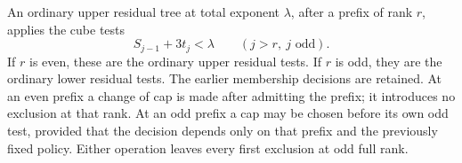 An ordinary upper residual tree at total exponent $\lambda$, after
a prefix of rank $r$, applies the cube tests
\begin{equation}\label{sv:upper-cubes}
 S_{j-1}+3t_j<\lambda\qquad(j>r,\ j\text{ odd}).
\end{equation}
If $r$ is even, these are the ordinary upper residual tests.  If $r$
is odd, they are the ordinary lower residual tests.  The earlier
membership decisions are retained.  At an even prefix a change of cap
is made after admitting the prefix; it introduces no exclusion at that
rank.  At an odd prefix a cap may be chosen before its own odd test,
provided that the decision depends only on that prefix and the
previously fixed policy.  Either operation leaves every first
exclusion at odd full rank.
